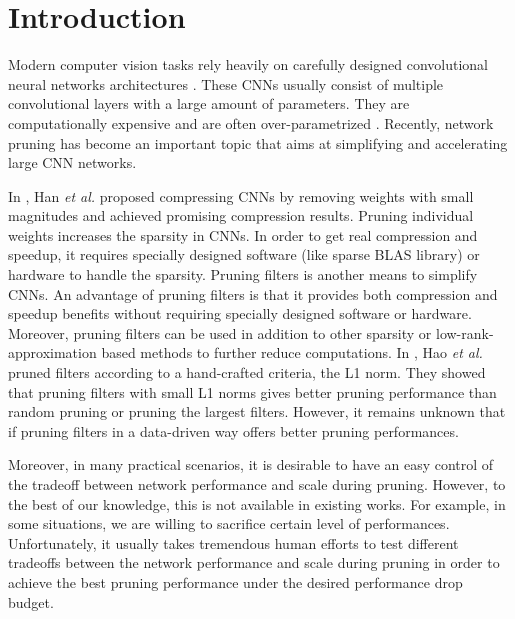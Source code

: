 \documentclass[10pt,twocolumn,letterpaper]{article}
\begin{document}



\section{Introduction}
Modern computer vision tasks rely heavily on carefully designed convolutional neural networks architectures \cite{alexnet, vgg, googlenet, resnet}. These CNNs usually consist of multiple convolutional layers with a large amount of parameters. They are computationally expensive and are often over-parametrized \cite{ppdl}. Recently, network pruning has become an important topic that aims at simplifying and accelerating large CNN networks.

In  \cite{han_both,han_deep} , Han  \textit{et al.} proposed compressing CNNs by removing weights with small magnitudes and achieved promising compression results. Pruning individual weights increases the sparsity in CNNs. In order to get real compression and speedup, it requires specially designed software (like sparse BLAS library) or hardware \cite{eie} to handle the sparsity. Pruning filters is another means to simplify CNNs. An advantage of pruning filters is that it provides both compression and speedup benefits without requiring specially designed software or hardware. Moreover, pruning filters can be used in addition to other sparsity or low-rank-approximation based methods to further reduce computations. In \cite{iclr17}, Hao \textit{et al.} pruned filters according to a hand-crafted criteria, the L1 norm. They showed that pruning filters with small L1 norms gives better pruning performance than random pruning or pruning the largest filters. However, it remains unknown that if pruning filters in a data-driven way offers better pruning performances. 

Moreover, in many practical scenarios, it is desirable to have an easy control of the tradeoff between network performance and scale during pruning. However, to the best of our knowledge, this is not available in existing works. For example, in some situations, we are willing to sacrifice certain level of performances. Unfortunately, it usually takes tremendous human efforts to test different tradeoffs between the network performance and scale during pruning in order to achieve the best pruning performance under the desired performance drop budget.


\end{document}
